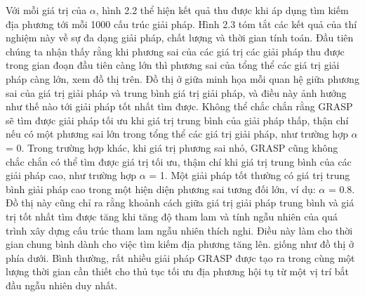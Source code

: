 \documentclass[14pt,a4paper]{report}
\begin{document}
Với mỗi giá trị của $\alpha$, hình 2.2 thể hiện kết quả thu được khi áp dụng tìm kiếm địa phương tới mỗi 1000 cấu trúc giải pháp. Hình 2.3 tóm tắt các kết quả của thí nghiệm này về sự đa dạng giải pháp, chất lượng và thời gian tính toán. Đầu tiên chúng ta nhận thấy rằng khi phương sai của các giá trị các giải pháp thu được trong gian đoạn đầu tiên càng lớn thì phương sai của tổng thể các giá trị giải pháp càng lớn, xem đồ thị trên. Đồ thị ở giữa minh họa mỗi quan hệ giữa phương sai của giá trị giải pháp và trung bình giá trị giải pháp, và điều này ảnh hưởng như thế nào tới giải pháp tốt nhất tìm được. Không thể chắc chắn rằng GRASP sẽ tìm được giải pháp tối ưu khi giá trị trung bình của giải pháp thấp, thận chí nếu có một phương sai lớn trong tổng thể các giá trị giải pháp, như trường hợp $\alpha$ = 0. Trong trường hợp khác, khi giá trị phương sai nhỏ, GRASP cũng không chắc chắn có thể tìm được giá trị tối ưu, thậm chí khi giá trị trung bình của các giải pháp cao, như trường hợp $\alpha$ = 1. Một giải pháp tốt thường có giá trị trung bình giải pháp cao trong một hiện diện phương sai tương đối lớn, ví dụ: $\alpha$ = 0.8. Đồ thị này cũng chỉ ra rằng khoảnh cách giữa giá trị giải pháp trung bình và giá trị tốt nhất tìm được tăng khi tăng độ tham lam và tính ngẫu nhiên của quá trình xây dựng cấu trúc tham lam ngẫu nhiên thích nghi. Điều này làm cho thời gian chung bình dành cho việc tìm kiếm địa phương tăng lên. giống như đồ thị ở phía dưới. Bình thường, rất nhiều giải pháp GRASP được tạo ra trong cùng một lượng thời gian cần thiết cho thủ tục tối ưu địa phương hội tụ từ một vị trí bắt đầu ngẫu nhiên duy nhất.\\
\end{document}
